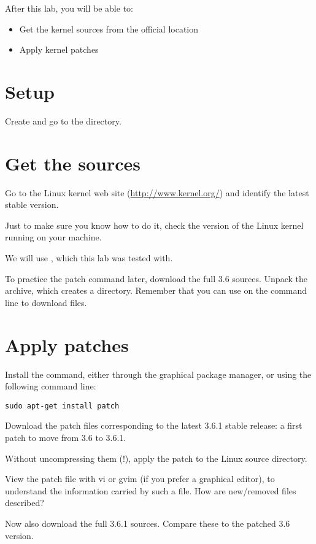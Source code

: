 
After this lab, you will be able to:
\begin{itemize}
\item Get the kernel sources from the official location
\item Apply kernel patches
\end{itemize}

\section{Setup}

Create and go to the  directory.

\section{Get the sources}

Go to the Linux kernel web site (\url{http://www.kernel.org/}) and
identify the latest stable version.

Just to make sure you know how to do it, check the version of the
Linux kernel running on your machine.

We will use , which this lab was tested with.

To practice the patch command later, download the full 3.6
sources. Unpack the archive, which creates a 
directory. Remember that you can use  on the command
line to download files.

\section{Apply patches}

Install the  command, either through the graphical package
manager, or using the following command line:

\begin{verbatim}
sudo apt-get install patch
\end{verbatim}

Download the patch files corresponding to the latest 3.6.1 stable
release: a first patch to move from 3.6 to 3.6.1.

Without uncompressing them (!), apply the patch to the Linux
source directory.

View the patch file with vi or gvim (if you prefer a
graphical editor), to understand the information carried by such a
file. How are new/removed files described?

Now also download the full 3.6.1 sources. Compare these to the patched 3.6 version.

